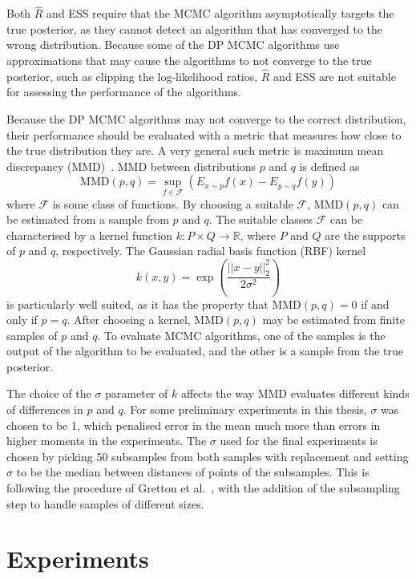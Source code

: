 \documentclass[english,twoside,openright]{HYgraduMLDS}
\newcommand{\R}{\mathbb{R}}
\begin{document}
Both \(\hat{R}\) and ESS require that the MCMC algorithm asymptotically targets 
the true posterior, as they cannot detect an algorithm that has converged to the 
wrong distribution. Because some of the DP MCMC algorithms use approximations 
that may cause the algorithms to not converge to the true posterior, 
such as clipping the log-likelihood ratios, \(\hat{R}\) and ESS are not suitable
for assessing the performance of the algorithms.

Because the DP MCMC algorithms may not converge to the correct distribution, 
their performance should be evaluated with a metric that measures how close 
to the true distribution they are. A very general such metric is maximum mean
discrepancy (MMD)~\cite{GrettonBRSS12}. MMD between distributions \(p\) and \(q\) 
is defined as 
\[
    \mathrm{MMD}(p, q) = \sup_{f\in \mathcal{F}}(E_{x\sim p}f(x) - E_{y\sim q}f(y))
\]
where \(\mathcal{F}\) is some class of functions. By 
choosing a suitable \(\mathcal{F}\), \(\mathrm{MMD}(p, q)\) can be estimated from a 
sample from \(p\) and \(q\). The suitable classes \(\mathcal{F}\) can be 
characterised by a kernel function \(k\colon P\times Q \to \R\), where 
\(P\) and \(Q\) are the supports of \(p\) and \(q\), respectively.
The Gaussian radial basis function (RBF) kernel 
\[
    k(x, y) = \exp\left(\frac{||x - y||_2^2}{2\sigma^2}\right)
\]
is particularly well suited, as it has the property that 
\(\mathrm{MMD}(p, q) = 0\) if and only if \(p = q\). After choosing a kernel,
\(\mathrm{MMD}(p, q)\) may be estimated from finite samples of \(p\) and \(q\).
To evaluate MCMC algorithms, one of the samples is the output of the algorithm 
to be evaluated, and the other is a sample from the true posterior.

The choice of the \(\sigma\) parameter of \(k\) affects the way MMD evaluates 
different kinds of differences in \(p\) and \(q\). For some preliminary experiments
in this thesis, \(\sigma\) was chosen to be 1, which penalised error in the 
mean much more than errors in higher moments in the experiments. 
The \(\sigma\) used for the final experiments is chosen by picking 50 subsamples
from both samples with replacement and setting \(\sigma\) to be the median 
between distances of points of the subsamples. This is following the procedure of 
Gretton et al.~\cite{GrettonBRSS12}, with the addition of the subsampling step
to handle samples of different sizes.

\chapter{Experiments}\label{experiment_chapter}
\end{document}
